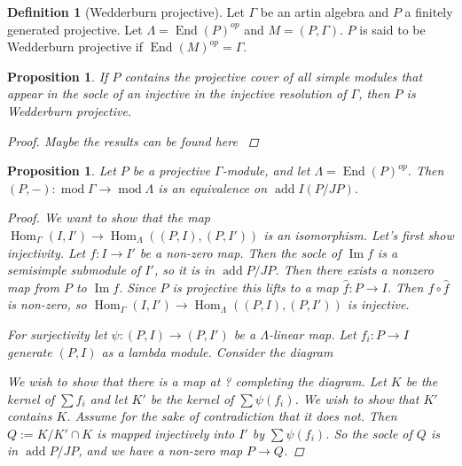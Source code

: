 \documentclass[11pt, a4paper, english]{article}
\newtheorem{prop}[theorem]{Proposition}
\theoremstyle{definition}
\newtheorem{defn}[theorem]{Definition}
\DeclareMathOperator{\Hom}{Hom}
\DeclareMathOperator{\End}{End}
\DeclareMathOperator{\Image}{Im}
\DeclareMathOperator{\add}{add}
\def\mod{\operatorname{mod}}
\begin{document}
\begin{defn}[Wedderburn projective]
	Let $\Gamma$ be an artin algebra and $P$ a finitely generated projective. Let $\Lambda = \End(P)^{op}$ and $M=(P, \Gamma)$. $P$ is said to be Wedderburn projective if $\End(M)^{op}=\Gamma$.
\end{defn}

\begin{prop}
	If $P$ contains the projective cover of all simple modules that appear in the socle of an injective in the injective resolution of $\Gamma$, then $P$ is Wedderburn projective.
	\begin{proof}
		Maybe the results can be found here \cite{Aus74}
	\end{proof}
\end{prop}

\begin{prop}
	Let $P$ be a projective $\Gamma$-module, and let $\Lambda = \End(P)^{op}$. Then $(P, -):\mod \Gamma \to \mod \Lambda$ is an equivalence on $\add I(P/JP)$.
	\begin{proof}
		We want to show that the map $\Hom_\Gamma(I, I') \to \Hom_\Lambda((P,I), (P, I'))$ is an isomorphism. Let's first show injectivity. Let $f:I\to I'$ be a non-zero map. Then the socle of $\Image f$ is a semisimple submodule of $I'$, so it is in $\add P/JP$. Then there exists a nonzero map from $P$ to $\Image f$. Since $P$ is projective this lifts to a map $\hat{f}:P\to I$. Then $f \circ \hat{f}$ is non-zero, so $\Hom_\Gamma(I, I') \to \Hom_\Lambda((P,I), (P, I'))$ is injective.
		
		For surjectivity let $\psi:(P,I)\to (P, I')$ be a $\Lambda$-linear map. Let $f_i:P\to I$ generate $(P,I)$ as a lambda module. Consider the diagram
		\begin{center}
		\end{center}
		We wish to show that there is a map at ? completing the diagram. Let $K$ be the kernel of $\sum f_i$ and let $K'$ be the kernel of $\sum \psi(f_i)$. We wish to show that $K'$ contains $K$. Assume for the sake of contradiction that it does not. Then $Q := K / K' \cap K$ is mapped injectively into $I'$ by $\sum \psi(f_i)$. So the socle of $Q$ is in $\add P/JP$, and we have a non-zero map $P \to Q$.
		

\end{proof}
\end{prop}
\end{document}
